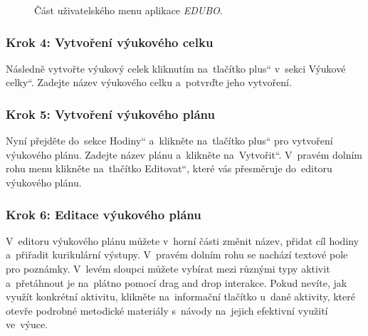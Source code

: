 \documentclass[male,czech,api_bc]{kitheses}
\begin{document}
\begin{figure}[H]
	\centering
	\caption{Část uživatelského menu aplikace \textit{EDUBO}.}
	\label{fig:manual-1}
\end{figure}

\subsubsection{Krok 4: Vytvoření výukového celku}
Následně vytvořte výukový celek kliknutím na~tlačítko \quotedblbase plus`` v~sekci \quotedblbase Výukové celky``. Zadejte název výukového celku a~potvrďte jeho vytvoření.

\subsubsection{Krok 5: Vytvoření výukového plánu}
Nyní přejděte do~sekce \quotedblbase Hodiny`` a~klikněte na~tlačítko \quotedblbase plus`` pro vytvoření výukového plánu. Zadejte název plánu a~klikněte na~\quotedblbase Vytvořit``. V~pravém dolním rohu menu klikněte na~tlačítko \quotedblbase Editovat``, které vás přesměruje do~editoru výukového plánu.

\subsubsection{Krok 6: Editace výukového plánu}
V~editoru výukového plánu můžete v~horní části změnit název, přidat cíl hodiny a~přiřadit kurikulární výstupy. V~pravém dolním rohu se nachází textové pole pro poznámky. V~levém sloupci můžete vybírat mezi různými typy aktivit a~přetáhnout je na~plátno pomocí drag and drop interakce. Pokud nevíte, jak využít konkrétní aktivitu, klikněte na~informační tlačítko u~dané aktivity, které otevře podrobné metodické materiály s~návody na~jejich efektivní využití ve~výuce.
\end{document}

